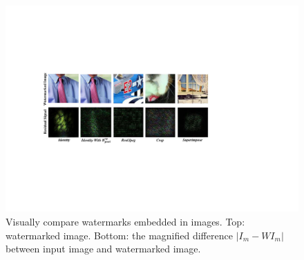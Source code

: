 \documentclass[sigconf]{acmart}
\begin{document}
\setlength{\tabcolsep}{1.4pt}



\begin{figure}[b]
	\centering 
	\includegraphics[width=1.0\linewidth]{picture/experiments2.pdf} 
	\caption{
		Visually compare watermarks embedded in images. Top: watermarked image. Bottom: the magnified difference $|I_{m}-WI_{m}|$ between input image and watermarked image.
	}
	\label{fig:Expermient 2}
\end{figure}
\end{document}
